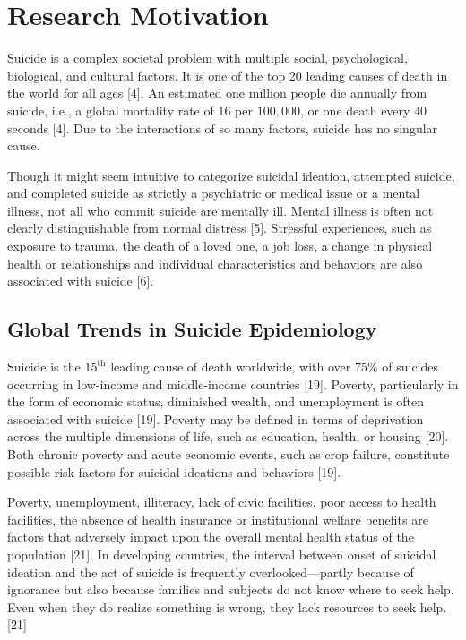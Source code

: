 \documentclass[]{article}
\begin{document}
\section{Research Motivation}\label{research-motivation}

Suicide is a complex societal problem with multiple social,
psychological, biological, and cultural factors. It is one of the top 20
leading causes of death in the world for all ages {[}4{]}. An estimated
one million people die annually from suicide, i.e., a global mortality
rate of \(16\) per \(100,000\), or one death every \(40\) seconds
{[}4{]}. Due to the interactions of so many factors, suicide has no
singular cause.

Though it might seem intuitive to categorize suicidal ideation,
attempted suicide, and completed suicide as strictly a psychiatric or
medical issue or a mental illness, not all who commit suicide are
mentally ill. Mental illness is often not clearly distinguishable from
normal distress {[}5{]}. Stressful experiences, such as exposure to
trauma, the death of a loved one, a job loss, a change in physical
health or relationships and individual characteristics and behaviors are
also associated with suicide {[}6{]}.

\subsection{Global Trends in Suicide
Epidemiology}\label{global-trends-in-suicide-epidemiology}

Suicide is the \(15^{\text{th}}\) leading cause of death worldwide, with
over \(75\%\) of suicides occurring in low-income and middle-income
countries {[}19{]}. Poverty, particularly in the form of economic
status, diminished wealth, and unemployment is often associated with
suicide {[}19{]}. Poverty may be defined in terms of deprivation across
the multiple dimensions of life, such as education, health, or housing
{[}20{]}. Both chronic poverty and acute economic events, such as crop
failure, constitute possible risk factors for suicidal ideations and
behaviors {[}19{]}.

Poverty, unemployment, illiteracy, lack of civic facilities, poor access
to health facilities, the absence of health insurance or institutional
welfare benefits are factors that adversely impact upon the overall
mental health status of the population {[}21{]}. In developing
countries, the interval between onset of suicidal ideation and the act
of suicide is frequently overlooked---partly because of ignorance but
also because families and subjects do not know where to seek help. Even
when they do realize something is wrong, they lack resources to seek
help. {[}21{]}
\end{document}
